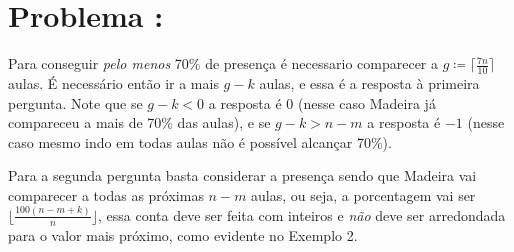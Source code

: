 \section*{Problema \proxLetra: }

Para conseguir \emph{pelo menos} 70\% de presença é necessario comparecer a $g \coloneqq \lceil \frac{7n}{10} \rceil$ aulas.
É necessário então ir a mais $g - k$ aulas, e essa é a resposta à primeira pergunta. Note que se $g - k < 0$ a resposta é $0$ (nesse caso Madeira já compareceu a mais de 70\% das aulas), e se $g - k > n - m$ a resposta é $-1$ (nesse caso mesmo indo em todas aulas não é possível alcançar 70\%).

Para a segunda pergunta basta considerar a presença sendo que Madeira vai comparecer a todas as próximas $n - m$ aulas, ou seja, a porcentagem vai ser $\lfloor \frac{100(n - m + k)}{n} \rfloor$, essa conta deve ser feita com inteiros e \emph{não} deve ser arredondada para o valor mais próximo, como evidente no Exemplo 2.



